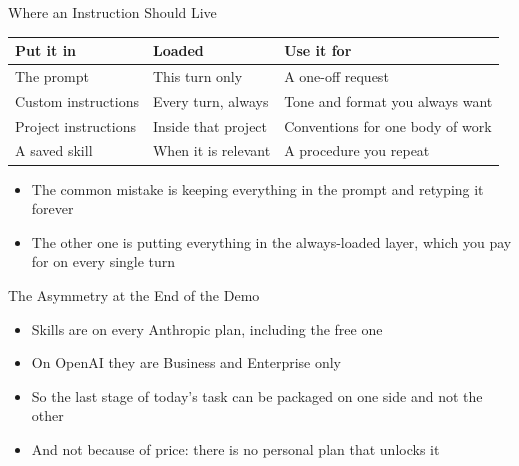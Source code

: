 \documentclass[aspectratio=169]{beamer}
\begin{document}
\begin{frame}{Where an Instruction Should Live}
    \begin{center}
    \small
    \begin{tabular}{lll}
        \toprule
        Put it in & Loaded & Use it for \\
        \midrule
        The prompt           & This turn only        & A one-off request \\
        Custom instructions  & Every turn, always    & Tone and format you always want \\
        Project instructions & Inside that project   & Conventions for one body of work \\
        A saved skill        & When it is relevant   & A procedure you repeat \\
        \bottomrule
    \end{tabular}
    \end{center}

    \vspace{1em}
    \begin{itemize}
        \item The common mistake is keeping everything in the prompt and retyping it forever
        \item The other one is putting everything in the always-loaded layer, which you pay
              for on every single turn
    \end{itemize}
\end{frame}

\begin{frame}{The Asymmetry at the End of the Demo}
    \begin{itemize}
        \item Skills are on every Anthropic plan, including the free one
        \item On OpenAI they are Business and Enterprise only
        \item So the last stage of today's task can be packaged on one side and not the other
        \item And not because of price: there is no personal plan that unlocks it
    \end{itemize}
\end{frame}
\end{document}
